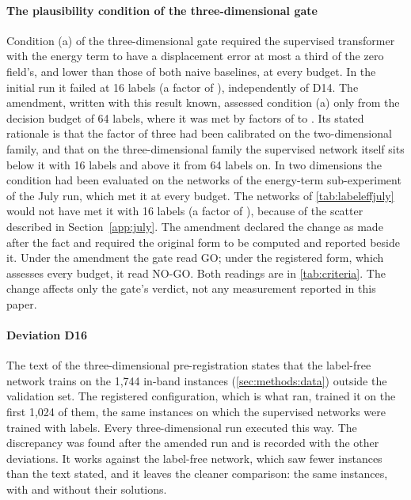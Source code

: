\paragraph{The plausibility condition of the three-dimensional gate}
Condition (a) of the three-dimensional gate required the supervised transformer with the
energy term to have a displacement error at most a third of the zero field's, and lower than
those of both naive baselines, at every budget. In the initial run it failed at 16
labels (a factor of \numGTwoSanitySixteen{}), independently of D14. The amendment, written with
this result known, assessed condition (a) only from the decision budget of 64 labels, where
it was met by factors of \numGTwoSanitySixtyFour{} to \numGTwoSanityMax{}. Its stated
rationale is that the factor of three had been calibrated on the two-dimensional family,
and that on the three-dimensional family the supervised network itself sits below it with
16 labels and above it from 64 labels on. In two dimensions the condition had been evaluated on
the networks of the energy-term sub-experiment of the July run, which met it at every budget. The networks of \cref{tab:labeleffjuly} would not have met it with 16 labels
(a factor of \numGOneSanityTableSixteen{}), because of the scatter described in
Section~\ref{app:july}.
The amendment declared the change as made after the fact and required the original form to
be computed and reported beside it. Under the amendment the gate read GO; under the
registered form, which assesses every budget, it read NO-GO. Both readings are in
\cref{tab:criteria}. The change affects only the gate's verdict, not any measurement
reported in this paper.

\paragraph{Deviation D16}
The text of the three-dimensional pre-registration states that the label-free network
trains on the 1,744 in-band instances (\cref{sec:methods:data}) outside the validation
set. The registered
configuration, which is what ran, trained it on the first 1,024 of them, the same instances
on which the supervised networks were trained with labels. Every three-dimensional run
executed this way. The discrepancy was found after the amended run and is recorded with the
other deviations. It works against the label-free network, which saw fewer instances than
the text stated, and it leaves the cleaner comparison: the same instances, with and
without their solutions.

